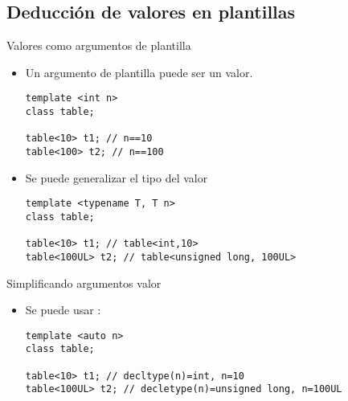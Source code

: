 \subsection{Deducción de valores en plantillas}

\begin{frame}[t,fragile]{Valores como argumentos de plantilla}
\begin{itemize}
  \item Un argumento de plantilla puede ser un valor.
\begin{lstlisting}
template <int n>
class table;

table<10> t1; // n==10
table<100> t2; // n==100
\end{lstlisting}

  \vfill\pause
  \item Se puede generalizar el tipo del valor
\begin{lstlisting}
template <typename T, T n>
class table;

table<10> t1; // table<int,10>
table<100UL> t2; // table<unsigned long, 100UL>
\end{lstlisting}

\end{itemize}
\end{frame}

\begin{frame}[t,fragile]{Simplificando argumentos valor}
\begin{itemize}
  \item Se puede usar :
\begin{lstlisting}
template <auto n>
class table;

table<10> t1; // decltype(n)=int, n=10
table<100UL> t2; // decletype(n)=unsigned long, n=100UL
\end{lstlisting}
\end{itemize}
\end{frame}

